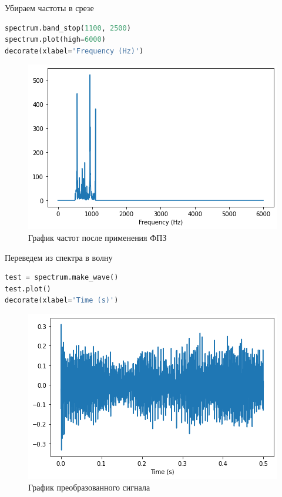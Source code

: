 Убираем частоты в срезе
\begin{lstlisting}[language=Python]
spectrum.band_stop(1100, 2500)
spectrum.plot(high=6000)
decorate(xlabel='Frequency (Hz)')
\end{lstlisting}

\begin{figure}[H]
	\begin{center}
		\includegraphics[scale=1]{fig/lab01/lab01_06.png}
		\caption{График частот после применения ФПЗ}
	\end{center}
\end{figure}

Переведем из спектра в волну
\begin{lstlisting}[language=Python]
test = spectrum.make_wave()
test.plot()
decorate(xlabel='Time (s)')
\end{lstlisting}

\begin{figure}[H]
	\begin{center}
		\includegraphics[scale=1]{fig/lab01/lab01_07.png}
		\caption{График преобразованного сигнала}
	\end{center}
\end{figure}


